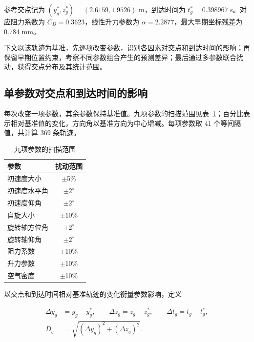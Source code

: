 \documentclass[12pt,letterpaper]{article}
\newcommand{\SensitivityReferenceY}{2.6159}
\newcommand{\SensitivityReferenceZ}{1.9526}
\newcommand{\SensitivityReferenceTime}{0.398967}
\begin{document}
参考交点记为 $(y_g^*,z_g^*)=(\SensitivityReferenceY,\SensitivityReferenceZ)$ m，到达时间为 $t_g^*=\SensitivityReferenceTime$ s。对应阻力系数为 $C_D=0.3623$，线性升力参数为 $\alpha=2.2877$，最大早期坐标残差为 0.784 mm。

下文以该轨迹为基准，先逐项改变参数，识别各因素对交点和到达时间的影响；再保留早期位置约束，考察不同参数组合产生的预测差异；最后通过多参数联合扰动，获得交点分布及其统计范围。

\FloatBarrier
\subsection{单参数对交点和到达时间的影响}\label{sec:sensitivity-local}

\noindent\hspace*{\parindent}每次改变一项参数，其余参数保持基准值。九项参数的扫描范围见表~\ref{tab:sensitivity-scan-ranges}；百分比表示相对基准值的变化，方向角以基准方向为中心增减。每项参数取 41 个等间隔值，共计算 369 条轨迹。

\begin{table}[H]\centering\small
\renewcommand{\arraystretch}{1.15}
\caption{九项参数的扫描范围}
\begin{tabular}{lc}\toprule
参数 & 扰动范围\\\midrule
初速度大小 & $\pm$5\%\\
初速度水平角 & $\pm$$2^\circ$\\
初速度仰角 & $\pm$$2^\circ$\\
自旋大小 & $\pm$10\%\\
旋转轴方位角 & $\pm$$2^\circ$\\
旋转轴仰角 & $\pm$$2^\circ$\\
阻力系数 & $\pm$10\%\\
升力参数 & $\pm$10\%\\
空气密度 & $\pm$10\%\\
\bottomrule\end{tabular}\label{tab:sensitivity-scan-ranges}
\end{table}


以交点和到达时间相对基准轨迹的变化衡量参数影响，定义


\begin{equation}
\begin{aligned}
\Delta y_g&=y_g-y_g^*,\qquad
\Delta z_g=z_g-z_g^*,\qquad
\Delta t_g=t_g-t_g^*,\\
D_g&=\sqrt{(\Delta y_g)^2+(\Delta z_g)^2}.
\end{aligned}
\label{eq:sensitivity-displacement}
\end{equation}
\end{document}
